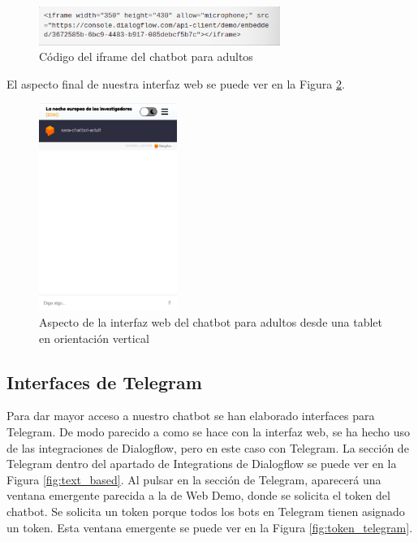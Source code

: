 \begin{figure}[h]
\centering
\includegraphics[width=0.7\textwidth]{imagenes/07_Implementacion/codigo_iframe.png}
\caption{Código del iframe del chatbot para adultos}
\label{fig:codigo_iframe}
\end{figure}

El aspecto final de nuestra interfaz web se puede ver en la Figura \ref{fig:interfaz_web}.

\begin{figure}[h]
\centering
\includegraphics[width=0.4\textwidth]{imagenes/07_Implementacion/interfaz_web.png}
\caption{Aspecto de la interfaz web del chatbot para adultos desde una tablet en orientación vertical}
\label{fig:interfaz_web}
\end{figure}

\subsection{Interfaces de Telegram}

Para dar mayor acceso a nuestro chatbot se han elaborado interfaces para Telegram. De modo parecido a como se hace con la interfaz web, se ha hecho uso de las integraciones de Dialogflow, pero en este caso con Telegram. La sección de Telegram dentro del apartado de Integrations de Dialogflow se puede ver en la Figura \ref{fig:text_based}. Al pulsar en la sección de Telegram, aparecerá una ventana emergente parecida a la de Web Demo, donde se solicita el token del chatbot. Se solicita un token porque todos los bots en Telegram tienen asignado un token. Esta ventana emergente se puede ver en la Figura \ref{fig:token_telegram}.

